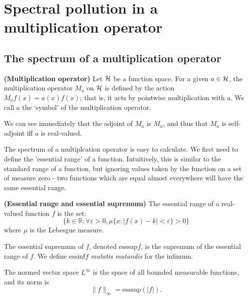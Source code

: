 \documentclass[../main.tex]{subfiles}
\begin{document}
\section{Spectral pollution in a multiplication operator}
\subsection{The spectrum of a multiplication operator}
\begin{definition}{\textbf{(Multiplication operator)}}
Let $\mathcal{H}$ be a function space. For a given $a \in \mathcal{H}$, the multiplication operator $M_a$ on $\mathcal{H}$ is defined by
the action $M_af(x) = a(x)f(x)$; that is, it acts by pointwise multiplication with $a$. We call $a$ the `symbol' of
the multiplication operator.
\end{definition}

We can see immediately that the adjoint of $M_a$ is $M_{\overline{a}}$, and thus that $M_a$ is self-adjoint iff $a$ is real-valued.

The spectrum of a multiplcation operator is easy to calculate. We first
need to define the 'essential range' of a function. Intuitively, this is
similar to the standard range of a function, but ignoring values taken by
the function on a set of measure zero - two functions which are equal
almost everywhere will have the same essential range.

\begin{definition}{\textbf{(Essential range and essential supremum)}}\label{defn:essential-range}
  The essential range of a real-valued function $f$ is the set:
  $$\{k \in \mathbb{R} : \forall \varepsilon > 0, \mu\{x : |f(x) - k| < \varepsilon\} > 0\}$$
  where $\mu$ is the Lebesgue measure.
  
  The essential supremum of $f$, denoted $\mathrm{esssup}f$, is the supremum of the essential range of $f$. 
  We define $\mathrm{essinf}f$ \emph{mutatis mutandis} for the infimum.
\end{definition}

The normed vector space $L^\infty$ is the space of all bounded measurable functions, and its norm is $$\|f\|_\infty = \text{esssup}(|f|).$$
\end{document}
